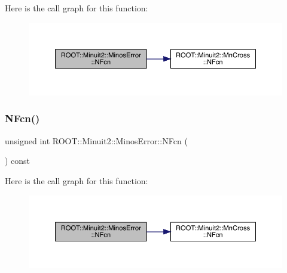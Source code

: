 Here is the call graph for this function\+:
\nopagebreak
\begin{figure}[H]
\begin{center}
\leavevmode
\includegraphics[width=350pt]{d2/dd1/classROOT_1_1Minuit2_1_1MinosError_a4956b01f7899f42847617c378e5c86c2_cgraph}
\end{center}
\end{figure}
\mbox{\label{classROOT_1_1Minuit2_1_1MinosError_a4956b01f7899f42847617c378e5c86c2}} 
\subsubsection{\texorpdfstring{NFcn()}{NFcn()}\hspace{0.1cm}{\footnotesize\ttfamily [3/3]}}
{\footnotesize\ttfamily unsigned int R\+O\+O\+T\+::\+Minuit2\+::\+Minos\+Error\+::\+N\+Fcn (\begin{DoxyParamCaption}{ }\end{DoxyParamCaption}) const\hspace{0.3cm}{\ttfamily [inline]}}

Here is the call graph for this function\+:
\nopagebreak
\begin{figure}[H]
\begin{center}
\leavevmode
\includegraphics[width=350pt]{d2/dd1/classROOT_1_1Minuit2_1_1MinosError_a4956b01f7899f42847617c378e5c86c2_cgraph}
\end{center}
\end{figure}
\mbox{\label{classROOT_1_1Minuit2_1_1MinosError_ac45b7f3397fe4c13e1811b486e10602a}} 
